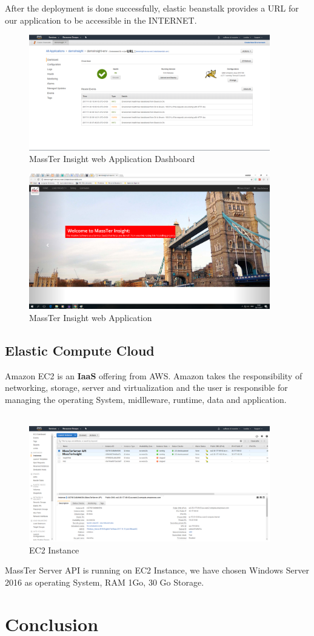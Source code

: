 After the deployment is done successfully, elastic beanstalk provides a URL for our application to be accessible in the INTERNET.
	 \begin{figure}[h]
	\centering
	\includegraphics[angle=90,width=10.5cm]{massTerInsightDashboard.png}
	\caption{MassTer Insight web Application Dashboard}	
\end{figure} 
	 \begin{figure}[h]
	\centering
	\includegraphics[angle=90,width=10.5cm]{massTerInsightWeb.png}
	\caption{MassTer Insight web Application}	
\end{figure} 
     \clearpage
	\newpage 
	\subsection{Elastic Compute Cloud}
	Amazon EC2 is an \textbf{IaaS} offering from AWS. Amazon takes the responsibility of networking, storage, server and virtualization and the user is responsible for managing the operating System, midlleware, runtime, data and application.
	\\
	\\
	 \begin{figure}[h]
		\centering
		\includegraphics[angle=90,width=10.5cm]{ec2Instance.png}
		\caption{EC2 Instance}	
	\end{figure} 
	MassTer Server API is running on EC2 Instance, we have chosen Windows Server 2016 as operating System, RAM 1Go, 30 Go Storage. 
	\clearpage
	\newpage
	\section{Conclusion}